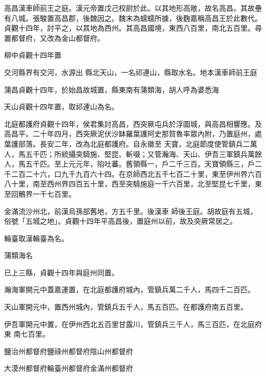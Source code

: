\begin{pinyinscope}
 高昌漢車師前王之庭。漢元帝置戊己校尉於此。以其地形高敞，故名高昌。其故壘有八城。張駿置高昌郡，後魏因之。魏末為蠕蠕所據，後麴嘉稱高昌王於此數代。貞觀十四年，討平之，以其地為西州。其高昌國境，東西八百里，南北五百里。尋置都督府，又改為金山都督府。



 柳中貞觀十四年置



 交河縣界有交河，水源出
 縣北天山，一名祁連山，縣取水名。地本漢車師前王庭



 蒲昌貞觀十四年，於始昌故城置，縣東南有蒲類海，胡人呼為婆悉海



 天山貞觀十四年置，取祁連山為名。



 北庭都護府貞觀十四年，侯君集討高昌，西突厥屯兵於浮圖城，與高昌相響應。及高昌平。二十年四月，西突厥泥伏沙缽羅葉護阿史那賀魯率眾內附，乃置庭州，處葉護部落。長安二年，改為北庭都護府。自永徽至
 天寶，北庭節度使管鎮兵二萬人，馬五千匹；所統攝突騎施、堅昆、斬啜；又管瀚海、天山、伊吾三軍鎮兵萬餘人，馬五千匹。至上元元年，陷吐蕃。舊領縣一，戶二千三百。天寶領縣三，戶二千二百二十六，口九千九百六十四。在京師西北五千七百二十里，東至伊州界六百八十里，南至西州界四百五十里，西至突騎施庭一千六百里，北至堅昆七千里，東至回鶻界一千七百里。



 金滿流沙州北，前漢烏孫部舊地，方五千里。後漢車
 師後王庭。胡故庭有五城，俗號「五城之地」。貞觀十四年平高昌後，置庭州以前，故及突厥常居之。



 輪臺取漢輪臺為名。



 蒲類海名



 已上三縣，貞觀十四年與庭州同置。



 瀚海軍開元中蓋嘉運置，在北庭都護府城內，管鎮兵萬二千人，馬四千二百匹。



 天山軍開元中，置西州城內，管鎮兵五千人，馬五百匹。在都護府南五百里。



 伊吾軍開元中置，在伊州西北五百里甘露川，管鎮兵三千人，馬三百匹，在北庭府東
 南七百里。



 鹽治州都督府鹽祿州都督府陰山州都督府



 大漠州都督府輪臺州都督府金滿州都督府




\end{pinyinscope}
